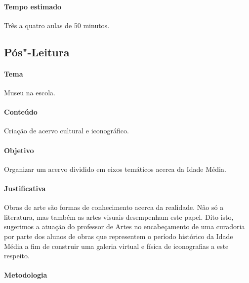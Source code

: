 \documentclass[12pt]{extarticle}
\begin{document}
 \paragraph{Tempo estimado} Três a quatro aulas de 50 minutos.


\subsection{Pós"-Leitura}

 \paragraph{Tema} Museu na escola. 

 \paragraph{Conteúdo} Criação de acervo cultural e iconográfico.

 \paragraph{Objetivo} Organizar um acervo dividido em eixos temáticos acerca da Idade Média.

 \paragraph{Justificativa} Obras de arte são formas de conhecimento acerca da realidade. 
 Não só a literatura, mas também as artes visuais desempenham este papel. Dito isto,
 sugerimos a atuação do professor de Artes no encabeçamento de uma curadoria por 
 parte dos alunos de obras que representem o período histórico da Idade Média a fim
 de construir uma galeria virtual e física de iconografias a este respeito. 

 \paragraph{Metodologia}
 	
\end{document}
